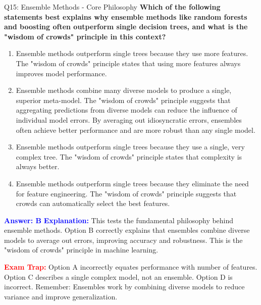 \documentclass[8pt]{beamer}
\begin{document}
	\begin{frame}{Q15: Ensemble Methods - Core Philosophy}
		\fontsize{6.5}{7.5}\selectfont
		\textbf{Which of the following statements best explains why ensemble methods like random forests and boosting often outperform single decision trees, and what is the "wisdom of crowds" principle in this context?}
		
		\begin{enumerate}
			\item Ensemble methods outperform single trees because they use more features. The "wisdom of crowds" principle states that using more features always improves model performance.
			\item Ensemble methods combine many diverse models to produce a single, superior meta-model. The "wisdom of crowds" principle suggests that aggregating predictions from diverse models can reduce the influence of individual model errors. By averaging out idiosyncratic errors, ensembles often achieve better performance and are more robust than any single model.
			\item Ensemble methods outperform single trees because they use a single, very complex tree. The "wisdom of crowds" principle states that complexity is always better.
			\item Ensemble methods outperform single trees because they eliminate the need for feature engineering. The "wisdom of crowds" principle suggests that crowds can automatically select the best features.
		\end{enumerate}
		
		\vspace{0.1cm}
		\textcolor{blue}{\textbf{Answer: B}}
		\vspace{0.1cm}
		\textcolor{blue}{\textbf{Explanation:}} This tests the fundamental philosophy behind ensemble methods. Option B correctly explains that ensembles combine diverse models to average out errors, improving accuracy and robustness. This is the "wisdom of crowds" principle in machine learning.
		
		\textcolor{red}{\textbf{Exam Trap:}} Option A incorrectly equates performance with number of features. Option C describes a single complex model, not an ensemble. Option D is incorrect. Remember: Ensembles work by combining diverse models to reduce variance and improve generalization.
	\end{frame}
	
\end{document}
